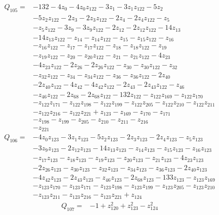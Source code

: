 \[\begin{aligned}Q_{105}={}&-132-4z_{0}-4z_{0}z_{122}-3z_{1}-3z_{1}z_{122}-5z_{2}
\\&-5z_{2}z_{122}-2z_{3}-2z_{3}z_{122}-2z_{4}-2z_{4}z_{122}-z_{5}
\\&-z_{5}z_{122}-3z_{9}-3z_{9}z_{122}-2z_{12}-2z_{12}z_{122}-14z_{13}
\\&-14z_{13}z_{122}-z_{14}-z_{14}z_{122}-z_{15}-z_{15}z_{122}-z_{16}
\\&-z_{16}z_{122}-z_{17}-z_{17}z_{122}-z_{18}-z_{18}z_{122}-z_{19}
\\&-z_{19}z_{122}-z_{20}-z_{20}z_{122}-z_{21}-z_{21}z_{122}-4z_{23}
\\&-4z_{23}z_{122}-2z_{26}-2z_{26}z_{122}-z_{30}-z_{30}z_{122}-z_{32}
\\&-z_{32}z_{122}-z_{34}-z_{34}z_{122}-z_{36}-z_{36}z_{122}-2z_{40}
\\&-2z_{40}z_{122}-4z_{42}-4z_{42}z_{122}-2z_{43}-2z_{43}z_{122}-z_{46}
\\&-z_{46}z_{122}-2z_{68}-2z_{68}z_{122}-132z_{122}-z_{122}z_{169}-z_{122}z_{170}
\\&-z_{122}z_{171}-z_{122}z_{198}-z_{122}z_{199}-z_{122}z_{205}-z_{122}z_{210}-z_{122}z_{211}
\\&-z_{122}z_{216}-z_{122}z_{221}+z_{123}-z_{169}-z_{170}-z_{171}
\\&-z_{198}-z_{199}-z_{205}-z_{210}-z_{211}-z_{216}
\\&-z_{221}
\end{aligned}\]
\[\begin{aligned}Q_{106}={}&-4z_{0}z_{123}-3z_{1}z_{123}-5z_{2}z_{123}-2z_{3}z_{123}-2z_{4}z_{123}-z_{5}z_{123}
\\&-3z_{9}z_{123}-2z_{12}z_{123}-14z_{13}z_{123}-z_{14}z_{123}-z_{15}z_{123}-z_{16}z_{123}
\\&-z_{17}z_{123}-z_{18}z_{123}-z_{19}z_{123}-z_{20}z_{123}-z_{21}z_{123}-4z_{23}z_{123}
\\&-2z_{26}z_{123}-z_{30}z_{123}-z_{32}z_{123}-z_{34}z_{123}-z_{36}z_{123}-2z_{40}z_{123}
\\&-4z_{42}z_{123}-2z_{43}z_{123}-z_{46}z_{123}-2z_{68}z_{123}-133z_{123}-z_{123}z_{169}
\\&-z_{123}z_{170}-z_{123}z_{171}-z_{123}z_{198}-z_{123}z_{199}-z_{123}z_{205}-z_{123}z_{210}
\\&-z_{123}z_{211}-z_{123}z_{216}-z_{123}z_{221}+z_{124}
\end{aligned}\]
\[\begin{aligned}Q_{107}={}&-1+z_{120}^{2}+z_{123}^{2}-z_{124}^{2}
\end{aligned}\]
